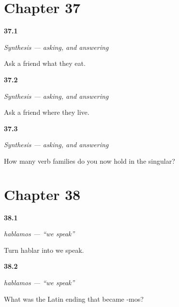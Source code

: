\section*{Chapter 37}

\noindent\begin{minipage}[t]{\linewidth}
\raggedright
\hypertarget{review-ES-C07-sintesis-preguntar-what}{\textbf{37.1}} \emph{Synthesis — asking, and answering}\par
\small Ask a friend what they eat.
\end{minipage}\par\medskip

\noindent\begin{minipage}[t]{\linewidth}
\raggedright
\hypertarget{review-ES-C07-sintesis-preguntar-where}{\textbf{37.2}} \emph{Synthesis — asking, and answering}\par
\small Ask a friend where they live.
\end{minipage}\par\medskip

\noindent\begin{minipage}[t]{\linewidth}
\raggedright
\hypertarget{review-ES-C07-sintesis-preguntar-families}{\textbf{37.3}} \emph{Synthesis — asking, and answering}\par
\small How many verb families do you now hold in the singular?
\end{minipage}\par\medskip

\section*{Chapter 38}

\noindent\begin{minipage}[t]{\linewidth}
\raggedright
\hypertarget{review-ES-C07-hablamos-form}{\textbf{38.1}} \emph{hablamos — \textquotedblleft{}we speak\textquotedblright{}}\par
\small Turn hablar into we speak.
\end{minipage}\par\medskip

\noindent\begin{minipage}[t]{\linewidth}
\raggedright
\hypertarget{review-ES-C07-hablamos-latin}{\textbf{38.2}} \emph{hablamos — \textquotedblleft{}we speak\textquotedblright{}}\par
\small What was the Latin ending that became -mos?
\end{minipage}\par\medskip

